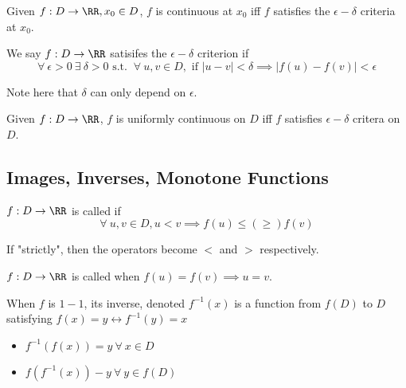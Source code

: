 \documentclass[12pt]{scrartcl}
\begin{document}
\begin{theorem}
  Given $f: D \to \RR, x_0 \in D$, $f$ is continuous at $x_0$ iff $f$ satisfies the 
  $\epsilon-\delta$ criteria at $x_0$.
\end{theorem}

\begin{definition}
  We say $f: D \to \RR$ satisifes the $\epsilon-\delta$ criterion  if 
  \[\forall \ \epsilon > 0 \ \exists \ \delta > 0 \text{ s.t. } \ \forall \ u, v \in D, \text{ if } |u-v| < \delta \implies |f(u) - f(v)| < \epsilon\]

  Note here that $\delta$ can only depend on $\epsilon$. 

\end{definition}

\begin{theorem}
  Given $f: D \to \RR$, $f$ is uniformly continuous on $D$ iff $f$ satisfies 
  $\epsilon-\delta$ critera on $D$.
\end{theorem}

\subsection{Images, Inverses, Monotone Functions}

\begin{definition}
  $f: D \to \RR$ is called  if
  \[\forall \ u, v \in D, u < v \implies f(u) \leq (\geq) f(v)\]

  If "strictly", then the operators become $<$ and $>$ respectively. 
\end{definition}

\begin{definition}
  $f: D \to \RR$ is called  when $f(u) = f(v) \implies u = v$. 
\end{definition}

\begin{definition}
  When $f$ is $1-1$, its inverse, denoted $f^{-1}(x)$ is a function from 
  $f(D)$ to $D$ satisfying $f(x) = y \leftrightarrow f^{-1}(y) = x$

  \begin{itemize}
    \item $f^{-1}(f(x)) = y \ \forall \ x \in D$
    \item $f(f^{-1}(x)) - y \ \forall \ y \in f(D)$
  \end{itemize}

\end{definition}
\end{document}
